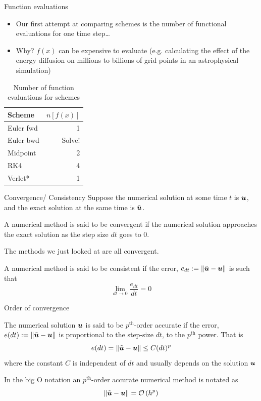 \documentclass[presentation]{beamer}
\newcommand{\gv}[1]{\ensuremath{\mbox{\boldmath$ #1 $}}}
\newcommand{\order}[1]{\mathcal O \left( #1 \right)} %
\begin{document}
\begin{frame}[label={sec:orgb9c2f90}]{Function evaluations}
\begin{itemize}
\item Our first attempt at comparing schemes is the number of functional
evaluations for one time step\ldots{}
\item Why? \(f(x)\) can be expensive to evaluate (e.g. calculating the effect
of the energy diffusion on millions to billions of
grid points in an astrophysical simulation)
\end{itemize}
\begin{table}[htbp]
\caption{\label{tab_sym_snake_params}
Number of function evaluations for schemes}
\centering
\begin{tabular}{lr}
\toprule
Scheme & \(n[f(x)]\)\\
\midrule
Euler fwd & 1\\
Euler bwd & Solve!\\
Midpoint & 2\\
RK4 & 4\\
Verlet* & 1\\
\bottomrule
\end{tabular}
\end{table}
\end{frame}
\begin{frame}[label={sec:org70b6da2}]{Convergence/ Consistency}
Suppose the numerical solution at some time \(t\) is \(\gv{u}\), and the
exact solution at the same time is \(\tilde{\gv{u}}\).
\begin{definition}[Convergence]
A numerical method is said to be convergent if the numerical solution
approaches the exact solution as the step size \(dt\) goes to 0.
\end{definition}
The methods we just looked at are all convergent.
\begin{definition}[Consistency]
A numerical method is said to be consistent if the error, \(e_{dt}:=\lVert\tilde{\gv{u}}-\gv{u} \rVert\) is such that
\[ \lim_{dt \to 0} \frac{e_{dt}}{dt} = 0\]
\end{definition}
\end{frame}
\begin{frame}[label={sec:org7839d60}]{Order of convergence}
\begin{definition}
The numerical solution \(\gv{u}\) is said to be \(p^{\text{th}}\)-order
accurate if the error, \(e(dt):=\lVert\tilde{\gv{u}}-\gv{u} \rVert\)
is proportional to the step-size \(dt\), to the \(p^{\text{th}}\) power. That
is
\[ e(dt)=\lVert\tilde{\gv{u}}-\gv{u} \rVert\leq C(dt)^{p} \]
where the constant \(C\) is independent of \(dt\) and usually depends on
the solution \(\gv{u}\)
\end{definition}
 In the big O notation an \(p^{\text{th}}\)-order accurate numerical method
 is notated as
\[ \lVert\tilde{\gv{u}}-\gv{u} \rVert = \order{h^p}\]
\end{frame}
\end{document}
